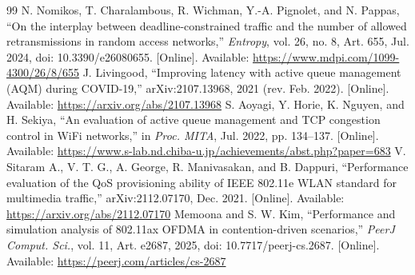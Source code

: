 \begin{thebibliography}{99}
 N. Nomikos, T. Charalambous, R. Wichman, Y.-A. Pignolet, and N. Pappas, ``On the interplay between deadline-constrained traffic and the number of allowed retransmissions in random access networks,'' \emph{Entropy}, vol. 26, no. 8, Art. 655, Jul. 2024, doi: 10.3390/e26080655. [Online]. Available: \url{https://www.mdpi.com/1099-4300/26/8/655}
 J. Livingood, ``Improving latency with active queue management (AQM) during COVID-19,'' arXiv:2107.13968, 2021 (rev. Feb. 2022). [Online]. Available: \url{https://arxiv.org/abs/2107.13968}
 S. Aoyagi, Y. Horie, K. Nguyen, and H. Sekiya, ``An evaluation of active queue management and TCP congestion control in WiFi networks,'' in \emph{Proc. MITA}, Jul. 2022, pp. 134--137. [Online]. Available: \url{https://www.s-lab.nd.chiba-u.jp/achievements/abst.php?paper=683}
 V. Sitaram A., V. T. G., A. George, R. Manivasakan, and B. Dappuri, ``Performance evaluation of the QoS provisioning ability of IEEE 802.11e WLAN standard for multimedia traffic,'' arXiv:2112.07170, Dec. 2021. [Online]. Available: \url{https://arxiv.org/abs/2112.07170}
 Memoona and S. W. Kim, ``Performance and simulation analysis of 802.11ax OFDMA in contention-driven scenarios,'' \emph{PeerJ Comput. Sci.}, vol. 11, Art. e2687, 2025, doi: 10.7717/peerj-cs.2687. [Online]. Available: \url{https://peerj.com/articles/cs-2687}
\end{thebibliography}
